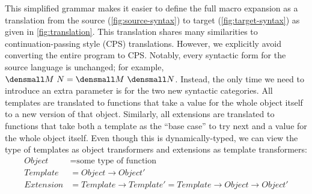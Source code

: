 This simplified grammar makes it easier to define the full macro expansion as a translation from the source (\cref{fig:source-syntax}) to target (\cref{fig:target-syntax}) as given in \cref{fig:translation}.
This translation shares many similarities to continuation-passing style (CPS) translations.
However, we explicitly avoid converting the entire program to CPS.
Notably, every syntactic form for the source language is unchanged; for example, $\den{M~N} = \den{M} ~ \den{N}$.
Instead, the only time we need to introduce an extra parameter is for the two new syntactic categories.
All templates are translated to functions that take a value for the whole object itself to a new version of that object.
Similarly, all extensions are translated to functions that take both a template as the ``base case'' to try next and a value for the whole object itself.
Even though this is dynamically-typed, we can view the type of templates as object transformers and extensions as template transformers:
\begin{align*}
  Object &= \text{some type of function}
  \\
  Template &= Object \to Object'
  \\
  Extension &= Template \to Template'
  = Template \to Object \to Object'
\end{align*}

